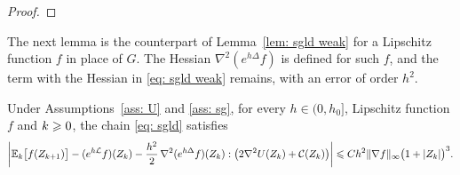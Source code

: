 \begin{proof}
\end{proof}

The next lemma is the counterpart of Lemma~\ref{lem: sgld weak} for a Lipschitz function $f$ in place of $G$. The Hessian $\nabla^2 ( e^{h\Delta} f )$ is defined for such $f$, and the term with the Hessian in \eqref{eq: sgld weak} remains, with an error of order $h^2$.

\begin{lemma}
\label{lem: sgld lipschitz weak}
    Under Assumptions~\ref{ass: U} and \ref{ass: sg}, for every $h \in (0,h_0]$, Lipschitz function $f$ and $k \geqslant 0$, the chain \eqref{eq: sgld} satisfies
    \begin{equation}
        \biggl| \mathbb E_k\bigl[ f(Z_{k+1}) \bigr] - (e^{h\mathcal L} f)(Z_k) - \frac{h^2}{2}\, \nabla^2 ( e^{h\Delta} f )(Z_k) : \bigl( 2\nabla^2 U(Z_k) + \mathcal C(Z_k) \bigr) \biggr| \leqslant C h^2 \lVert \nabla f \rVert_\infty \bigl( 1 + |Z_k| \bigr)^{3} .
        \label{eq: sgld lipschitz weak}
    \end{equation}
\end{lemma}

